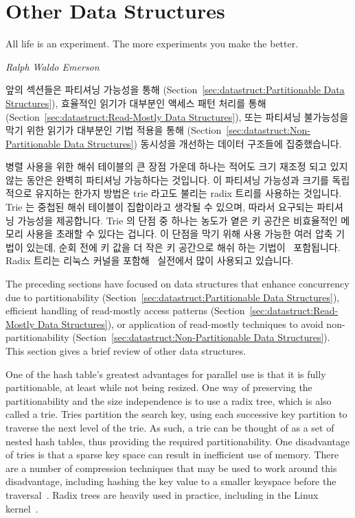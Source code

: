 \fi

\section{Other Data Structures}
\label{sec:datastruct:Other Data Structures}
%
\epigraph{All life is an experiment.  The more experiments you make the better.}
	 {\emph{Ralph Waldo Emerson}}

앞의 섹션들은 파티셔닝 가능성을 통해
(Section~\ref{sec:datastruct:Partitionable Data Structures}),
효율적인 읽기가 대부분인 액세스 패턴 처리를 통해
(Section~\ref{sec:datastruct:Read-Mostly Data Structures}),
또는 파티셔닝 불가능성을 막기 위한 읽기가 대부분인 기법 적용을 통해
(Section~\ref{sec:datastruct:Non-Partitionable Data Structures})
동시성을 개선하는 데이터 구조들에 집중했습니다.

병렬 사용을 위한 해쉬 테이블의 큰 장점 가운데 하나는 적어도 크기 재조정 되고
있지 않는 동안은 완벽히 파티셔닝 가능하다는 것입니다.
이 파티셔닝 가능성과 크기를 독립적으로 유지하는 한가지 방법은 trie 라고도
불리는 radix 트리를 사용하는 것입니다.
Trie 는 중첩된 해쉬 테이블이 집합이라고 생각될 수 있으며, 따라서 요구되는
파티셔닝 가능성을 제공합니다.
Trie 의 단점 중 하나는 농도가 옅은 키 공간은 비효율적인 메모리 사용을 초래할 수
있다는 겁니다.
이 단점을 막기 위해 사용 가능한 여러 압축 기법이 있는데, 순회 전에 키 값을 더
작은 키 공간으로 해쉬 하는 기법이~\cite{RobertOlsson2007Trash} 포함됩니다.
Radix 트리는 리눅스 커널을 포함해~\cite{NickPiggin2006radixtree} 실전에서 많이
사용되고 있습니다.

\iffalse

The preceding sections have focused on data structures that enhance
concurrency due to partitionability
(Section~\ref{sec:datastruct:Partitionable Data Structures}),
efficient handling of read-mostly access patterns
(Section~\ref{sec:datastruct:Read-Mostly Data Structures}),
or application of read-mostly techniques to avoid
non-partitionability
(Section~\ref{sec:datastruct:Non-Partitionable Data Structures}).
This section gives a brief review of other data structures.

One of the hash table's greatest advantages for parallel use is that it
is fully partitionable, at least while not being resized.
One way of preserving the partitionability and the size independence is
to use a radix tree, which is also called a trie.
Tries partition the search key, using each successive key partition
to traverse the next level of the trie.
As such, a trie can be thought of as a set of nested hash tables,
thus providing the required partitionability.
One disadvantage of tries is that a sparse key space can result in
inefficient use of memory.
There are a number of compression techniques that may be used to
work around this disadvantage, including hashing the key value to
a smaller keyspace before the
traversal~\cite{RobertOlsson2007Trash}.
Radix trees are heavily used in practice, including in the Linux
kernel~\cite{NickPiggin2006radixtree}.

